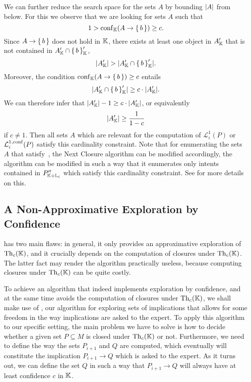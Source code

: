 We can further reduce the search space for the sets $A$ by bounding $\lvert A\rvert$ from below.
For this we observe that we are looking for sets $A$ such that
\begin{equation*}
  1 > \operatorname{conf}_{{\mathbb{K}}}(A \to {\ensuremath{\{\,b\,\}}}) \ge c.
\end{equation*}
Since $A \to {\ensuremath{\{\,b\,\}}}$ does not hold in ${\mathbb{K}}$, there exists at least one object in
$A_{{\mathbb{K}}}'$ that is not contained in $A_{{\mathbb{K}}}' \cap {\ensuremath{\{\,b\,\}}}_{{\mathbb{K}}}'$, \ie
\begin{equation*}
  \lvert A_{{\mathbb{K}}}' \rvert > \lvert A_{{\mathbb{K}}}' \cap {\ensuremath{\{\, b \,\}}}_{{\mathbb{K}}}' \rvert.
\end{equation*}
Moreover, the condition $\operatorname{conf}_{{\mathbb{K}}}(A \to {\ensuremath{\{\,b\,\}}}) \ge c$ entails
\begin{equation*}
  \lvert A_{{\mathbb{K}}}' \cap {\ensuremath{\{\,b\,\}}}_{{\mathbb{K}}}' \rvert \ge c \cdot \lvert A_{{\mathbb{K}}}'\rvert.
\end{equation*}
We can therefore infer that $\lvert A_{{\mathbb{K}}}'\rvert - 1 \geq c \cdot \lvert A_{{\mathbb{K}}}'\rvert$, or
equivalently
\begin{equation}
  \label{eq:64}
  \lvert A_{{\mathbb{K}}}'\rvert \geq \frac{1}{1 - c}
\end{equation}
if $c \neq 1$.  Then all sets $A$ which are relevant for the computation of
$\mathcal{L}_{i}^{1}(P)$ or $\mathcal{L}_{i}^{1,\operatorname{conf}}(P)$ satisfy this cardinality
constraint.  Note that for enumerating the sets $A$ that satisfy~, the Next
Closure algorithm can be modified accordingly, \ie the algorithm can be modified in such a
way that it enumerates only intents contained in $P_{{\mathbb{K}} \div {\ensuremath{\mathbb{L}}}_{i}}''$ which
satisfy this cardinality constraint.  See \cite[Theorem~51]{fca-book} for more details on
this.

\subsection{A Non-Approximative Exploration by Confidence}
\label{sec:poss-fast-expl}

 has two main flaws: in general, it only
provides an approximative exploration of $\operatorname{Th}_{c}({\mathbb{K}})$, and it crucially depends on
the computation of closures under $\operatorname{Th}_{c}({\mathbb{K}})$.  The latter fact may render the
algorithm practically useless, because computing closures under $\operatorname{Th}_{c}({\mathbb{K}})$ can be
quite costly.

To achieve an algorithm that indeed implements exploration by confidence, and at the same
time avoids the computation of closures under $\operatorname{Th}_{c}({\mathbb{K}})$, we shall make use of
, our algorithm for exploring sets of
implications that allows for some freedom in the way implications are asked to the expert.
To apply this algorithm to our specific setting, the main problem we have to solve is how
to decide whether a given set $P \subseteq M$ is closed under $\operatorname{Th}_{c}({\mathbb{K}})$ or not.
Furthermore, we need to define the way the sets $P_{i+1}$ and $Q$ are computed, which
eventually will constitute the implication $P_{i+1} \to Q$ which is asked to the expert.
As it turns out, we can define the set $Q$ in such a way that $P_{i+1} \to Q$ will always
have at least confidence $c$ in ${\mathbb{K}}$.

